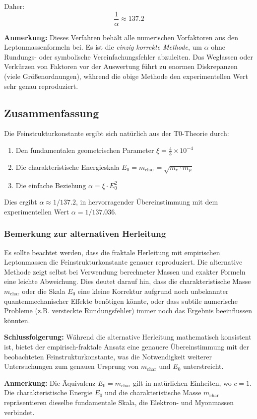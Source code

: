 \documentclass[12pt,a4paper]{article}
\newcommand{\xipar}{\xi}
\begin{document}
	Daher:
	\begin{equation}
		\boxed{\frac{1}{\alpha} \approx 137.2}
	\end{equation}
	
	\textbf{Anmerkung:} Dieses Verfahren beh\"alt alle numerischen Vorfaktoren aus den Leptonmassenformeln bei. Es ist die \textit{einzig korrekte Methode}, um $\alpha$ ohne Rundungs- oder symbolische Vereinfachungsfehler abzuleiten. Das Weglassen oder Verk\"urzen von Faktoren vor der Auswertung f\"uhrt zu enormen Diskrepanzen (viele Gr\"o\ss{}enordnungen), w\"ahrend die obige Methode den experimentellen Wert sehr genau reproduziert.
	
	\subsection{Zusammenfassung}
	
	Die Feinstrukturkonstante ergibt sich nat\"urlich aus der T0-Theorie durch:
	\begin{enumerate}
		\item Den fundamentalen geometrischen Parameter $\xipar = \frac{4}{3} \times 10^{-4}$
		\item Die charakteristische Energieskala $E_0 = m_{\text{char}} = \sqrt{m_e \cdot m_\mu}$
		\item Die einfache Beziehung $\alpha = \xipar \cdot E_0^2$
	\end{enumerate}
	
	Dies ergibt $\alpha \approx 1/137.2$, in hervorragender \"Ubereinstimmung mit dem experimentellen Wert $\alpha = 1/137.036$.
	
	\subsubsection*{Bemerkung zur alternativen Herleitung}
	
	Es sollte beachtet werden, dass die fraktale Herleitung mit empirischen Leptonmassen die Feinstrukturkonstante genauer reproduziert. Die alternative Methode zeigt selbst bei Verwendung berechneter Massen und exakter Formeln eine leichte Abweichung. Dies deutet darauf hin, dass die charakteristische Masse $m_{\text{char}}$ oder die Skala $E_0$ eine kleine Korrektur aufgrund noch unbekannter quantenmechanischer Effekte ben\"otigen k\"onnte, oder dass subtile numerische Probleme (z.B. versteckte Rundungsfehler) immer noch das Ergebnis beeinflussen k\"onnten.
	
	\textbf{Schlussfolgerung:} W\"ahrend die alternative Herleitung mathematisch konsistent ist, bietet der empirisch-fraktale Ansatz eine genauere \"Ubereinstimmung mit der beobachteten Feinstrukturkonstante, was die Notwendigkeit weiterer Untersuchungen zum genauen Ursprung von $m_{\text{char}}$ und $E_0$ unterstreicht.
	
	\textbf{Anmerkung:} Die \"Aquivalenz $E_0 = m_{\text{char}}$ gilt in nat\"urlichen Einheiten, wo $c = 1$. Die charakteristische Energie $E_0$ und die charakteristische Masse $m_{\text{char}}$ repr\"asentieren dieselbe fundamentale Skala, die Elektron- und Myonmassen verbindet.
	
\end{document}

